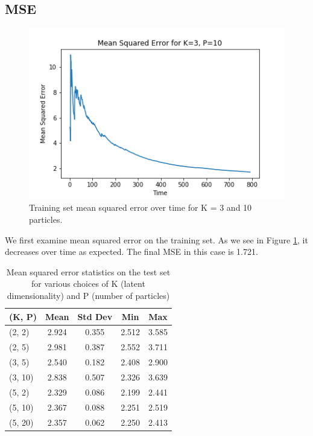\documentclass{article}
\begin{document}
\subsection{MSE}
\begin{figure}[ht]

\begin{center}
\centerline{\includegraphics[width=\columnwidth]{TrainMSE}}
\caption{Training set mean squared error over time for K = 3 and 10 particles.}
\label{TrainMSE}
\end{center}

\vskip -0.2in
\end{figure}

We first examine mean squared error on the training set. As we see in Figure \ref{TrainMSE}, it decreases
over time as expected. The final MSE in this case is 1.721.

\begin{table}[ht]
\caption{Mean squared error statistics on the test set for various choices of K
(latent dimensionality) and P (number of particles)}
\label{sample-table}
\vskip 0.15in
\begin{center}
\begin{small}
\begin{sc}
\begin{tabular}{lcccc}
\toprule
(K, P) & Mean & Std Dev & Min & Max \\
\midrule
(2, 2)  & 2.924 & 0.355 & 2.512 & 3.585 \\
(2, 5)  & 2.981 & 0.387 & 2.552 & 3.711 \\
(3, 5)  & 2.540 & 0.182 & 2.408 & 2.900 \\
(3, 10) & 2.838 & 0.507 & 2.326 & 3.639 \\
(5, 2)  & 2.329 & 0.086 & 2.199 & 2.441 \\
(5, 10) & 2.367 & 0.088 & 2.251 & 2.519 \\
(5, 20) & 2.357 & 0.062 & 2.250 & 2.413 \\
\bottomrule
\end{tabular}
\end{sc}
\end{small}
\end{center}
\vskip -0.1in
\end{table}
\end{document}
